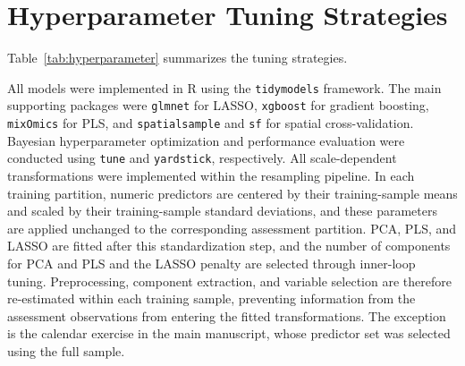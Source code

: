 \documentclass[10pt,a4paper]{article}
\begin{document}
\section{Hyperparameter Tuning Strategies}
\label{app:hyper}

Table~\ref{tab:hyperparameter} summarizes the tuning strategies.

All models were implemented in R using the \texttt{tidymodels} framework. The main supporting packages were \texttt{glmnet} for LASSO, \texttt{xgboost} for gradient boosting, \texttt{mixOmics} for PLS, and \texttt{spatialsample} and \texttt{sf} for spatial cross-validation. Bayesian hyperparameter optimization and performance evaluation were conducted using \texttt{tune} and \texttt{yardstick}, respectively. All scale-dependent transformations were implemented within the resampling pipeline. In each training partition, numeric predictors are centered by their training-sample means and scaled by their training-sample standard deviations, and these parameters are applied unchanged to the corresponding assessment partition. PCA, PLS, and LASSO are fitted after this standardization step, and the number of components for PCA and PLS and the LASSO penalty are selected through inner-loop tuning. Preprocessing, component extraction, and variable selection are therefore re-estimated within each training sample, preventing information from the assessment observations from entering the fitted transformations. The exception is the calendar exercise in the main manuscript, whose predictor set was selected using the full sample.

\begin{table}[!htbp]
    \centering
    \caption{Hyperparameter tuning under nested spatial cross-validation}
    \label{tab:hyperparameter}
\end{table}
\end{document}
